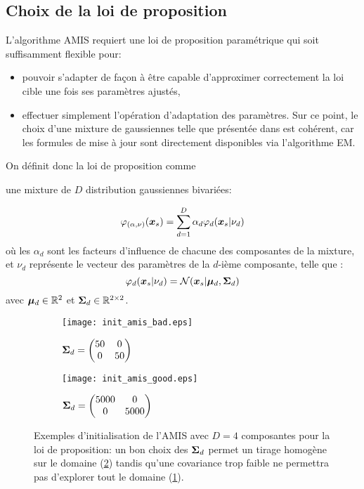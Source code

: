 \subsection{Choix de la loi de proposition}

L'algorithme AMIS requiert une loi de proposition paramétrique qui soit suffisamment flexible pour:
{
	\begin{itemize}
		\item pouvoir s'adapter de façon à être capable d'approximer correctement la loi cible une fois ses paramètres ajustés,
		\item effectuer simplement l'opération d'adaptation des paramètres. Sur ce point, le choix d'une mixture de gaussiennes telle que présentée dans \cite{Cappe2008} est cohérent, car les formules de mise à jour sont directement disponibles via l'algorithme EM.
	\end{itemize}

On définit donc la loi de proposition comme} une mixture de $D$ distribution gaussiennes bivariées:

\begin{equation}
\varphi_{(\alpha,\nu)}({{\bm{x}_s}}) = \sum\limits_{d=1}^D \alpha_d \varphi_d({{\bm{x}_s}} | \nu_d)
\label{eq_AE_21}
\end{equation}
où les $\alpha_d$ sont les facteurs d'influence de chacune des composantes de la mixture, et $\nu_d$ représente le vecteur des paramètres de la $d$-ième composante, telle que : 
\begin{equation}
\varphi_d({{\bm{x}_s}} | \nu_d) = \mathcal{N}({{\bm{x}_s}} | {\bm{\mu}}_d, {\bm{\Sigma}}_d)
\label{eq_AE_21_bis}
\end{equation}
avec ${\bm{\mu}}_d \in \mathbb{R}^2$ et ${\bm{\Sigma}}_d \in \mathbb{R}^{2\times2}$.

 \begin{figure}[h!]
 	\centering
 	\begin{subfigure}[t]{0.5\textwidth}
 		\centering
 		\texttt{[image: init\_amis\_bad.eps]}
 		\caption{${\bm{\Sigma}}_d = 
 			\begin{pmatrix}
 			50 & 0 \\
 			0 & 50
 			\end{pmatrix}$}
 		\label{init_amis_bad}
 	\end{subfigure}%
 	\begin{subfigure}[t]{0.5\textwidth}
 		\centering
 		\texttt{[image: init\_amis\_good.eps]}
 		\caption{${\bm{\Sigma}}_d = 
 			\begin{pmatrix}
 			5000 & 0 \\
 			0 & 5000
 			\end{pmatrix}$}
 		\label{init_amis_good}
 	\end{subfigure}
 	\caption{Exemples d'initialisation de l'AMIS avec $D=4$ composantes pour la loi de proposition: un bon choix des ${\bm{\Sigma}}_d$ permet un tirage homogène sur le domaine (\ref{init_amis_good}) tandis qu'une covariance trop faible ne permettra pas d'explorer tout le domaine (\ref{init_amis_bad}).}
 	 \label{fig_init_amis}	
 \end{figure}
 
